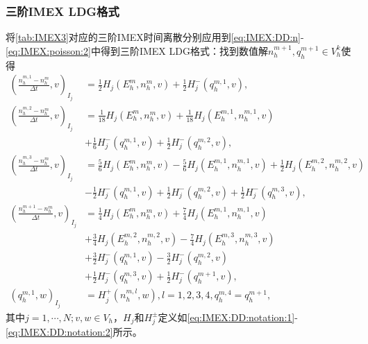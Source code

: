 \subsubsection{三阶IMEX LDG格式}
将\autoref{tab:IMEX3}对应的三阶IMEX时间离散分别应用到\eqref{eq:IMEX:DD:n}-\eqref{eq:IMEX:poisson:2}中得到三阶IMEX LDG格式：找到数值解$n_h^{m+1}, q_h^{m+1}\in V_h^k$使得
\begin{align}
    (\frac{n_h^{m,1} -n_h^m}{\Delta t},v)_{I_j} & =\frac{1}{2} H_j(E_h^m,n_h^m,v) + \frac{1}{2} H_j^-(q_h^{m,1},v),           \label{eq:IMEX:DD:LDG:1}                       \\
    (\frac{n_h^{m,2} -n_h^m}{\Delta t},v)_{I_j} & = \frac{1}{18} H_j(E_h^m,n_h^m,v) + \frac{1}{18} H_j(E_h^{m,1},n_h^{m,1},v) \nonumber                                      \\
                                                & + \frac{1}{6} H_j^-(q_h^{m,1},v) + \frac{1}{2} H_j^-(q_h^{m,2},v),                                                         \\
    (\frac{n_h^{m,3} -n_h^m}{\Delta t},v)_{I_j} & =\frac{5}{6} H_j(E_h^m,n_h^m,v) -\frac{5}{6} H_j(E_h^{m,1},n_h^{m,1},v) + \frac{1}{2} H_j(E_h^{m,2},n_h^{m,2},v) \nonumber \\
                                                & - \frac{1}{2} H_j^-(q_h^{m,1},v) + \frac{1}{2} H_j^-(q_h^{m,2},v) + \frac{1}{2} H_j^-(q_h^{m,3},v),                        \\
    (\frac{n_h^{m+1} -n_h^m}{\Delta t},v)_{I_j} & = \frac{1}{4} H_j(E_h^m,n_h^m,v) +\frac{7}{4} H_j(E_h^{m,1},n_h^{m,1},v)  \nonumber                                        \\
                                                & + \frac{3}{4} H_j(E_h^{m,2},n_h^{m,2},v) - \frac{7}{4} H_j(E_h^{m,3},n_h^{m,3},v) \nonumber                                \\
                                                & +\frac{3}{2} H_j^-(q_h^{m,1},v) -\frac{3}{2} H_j^-(q_h^{m,2},v) \nonumber                                                  \\
                                                & + \frac{1}{2} H_j^-(q_h^{m,3},v)  + \frac{1}{2} H_j^-(q_h^{m+1},v),                                                        \\
    (q_h^{m,1},w)_{I_j}                         & = H_j^+(n_h^{m,l},w), l = 1,2,3,4, q_h^{m,4} = q_h^{m+1},\label{eq:IMEX:DD:LDG:4}
\end{align}
其中$j = 1,\cdots,N;v,w \in V_h$，$H_j$和$H_j^{\pm}$定义如\eqref{eq:IMEX:DD:notation:1}-\eqref{eq:IMEX:DD:notation:2}所示。


